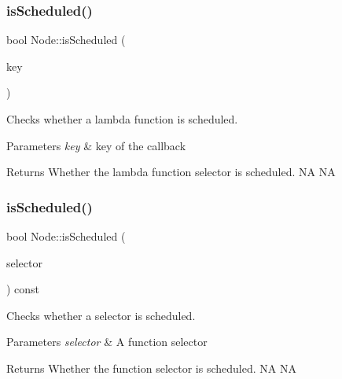 \subsubsection{\texorpdfstring{is\+Scheduled()}{isScheduled()}\hspace{0.1cm}{\footnotesize\ttfamily [2/4]}}
{\footnotesize\ttfamily bool Node\+::is\+Scheduled (\begin{DoxyParamCaption}\item[{const std\+::string \&}]{key }\end{DoxyParamCaption})}

Checks whether a lambda function is scheduled.


\begin{DoxyParams}{Parameters}
{\em key} & key of the callback \\
\hline
\end{DoxyParams}
\begin{DoxyReturn}{Returns}
Whether the lambda function selector is scheduled.  NA  NA 
\end{DoxyReturn}
\mbox{\label{classNode_a9b7c1b3796a8de31f3a9a962261f7c7e}} 
\subsubsection{\texorpdfstring{is\+Scheduled()}{isScheduled()}\hspace{0.1cm}{\footnotesize\ttfamily [3/4]}}
{\footnotesize\ttfamily bool Node\+::is\+Scheduled (\begin{DoxyParamCaption}\item[{S\+E\+L\+\_\+\+S\+C\+H\+E\+D\+U\+LE}]{selector }\end{DoxyParamCaption}) const}

Checks whether a selector is scheduled.


\begin{DoxyParams}{Parameters}
{\em selector} & A function selector \\
\hline
\end{DoxyParams}
\begin{DoxyReturn}{Returns}
Whether the function selector is scheduled.  NA  NA 
\end{DoxyReturn}
\mbox{\label{classNode_a4c3c2f91272c93216d2122848078e574}} 
